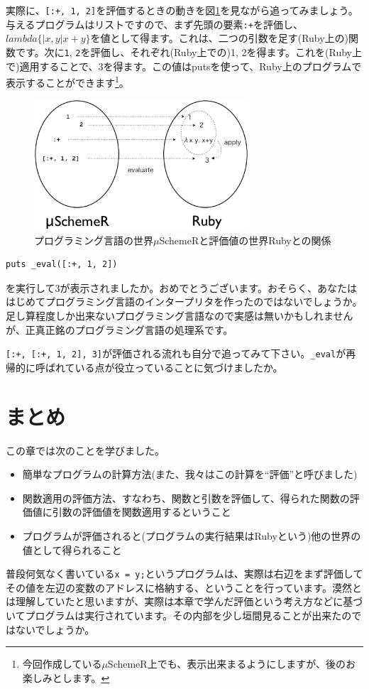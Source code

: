 実際に、{\tt [:+, 1, 2]}を評価するときの動きを図\ref{fig:uschemer_ruby}を見ながら追ってみましょう。与えるプログラムはリストですので、まず先頭の要素{\tt :+}を評価し、$lambda\{|x, y| x + y\}$を値として得ます。これは、二つの引数を足す(Ruby上の)関数です。次に{\tt 1}, {\tt 2}を評価し、それぞれ(Ruby上での)1, 2を得ます。これを(Ruby上で)適用することで、3を得ます。この値はputsを使って、Ruby上のプログラムで表示することができます\footnote{今回作成している$\mu$SchemeR上でも、表示出来まるようにしますが、後のお楽しみとします。}。

\begin{figure}[htbp]
\begin{center}
\includegraphics[width=80mm]{images/uschemer_ruby.eps}
\end{center}
\caption{プログラミング言語の世界$\mu$SchemeRと評価値の世界Rubyとの関係}
\label{fig:uschemer_ruby}
\end{figure}


\begin{lstlisting}
puts _eval([:+, 1, 2])
\end{lstlisting}

を実行して3が表示されましたか。おめでとうございます。おそらく、あなたははじめてプログラミング言語のインタープリタを作ったのではないでしょうか。足し算程度しか出来ないプログラミング言語なので実感は無いかもしれませんが、正真正銘のプログラミング言語の処理系です。

{\tt [:+, [:+, 1, 2], 3]}が評価される流れも自分で追ってみて下さい。{\tt \_eval}が再帰的に呼ばれている点が役立っていることに気づけましたか。

\section{まとめ}

この章では次のことを学びました。

\begin{itemize}
\item 簡単なプログラムの計算方法(また、我々はこの計算を“評価”と呼びました)
\item 関数適用の評価方法、すなわち、関数と引数を評価して、得られた関数の評価値に引数の評価値を関数適用するということ
\item プログラムが評価されると(プログラムの実行結果はRubyという)他の世界の値として得られること
\end{itemize}

普段何気なく書いている{\tt x = y;}というプログラムは、実際は右辺をまず評価してその値を左辺の変数のアドレスに格納する、ということを行っています。漠然とは理解していたと思いますが、実際は本章で学んだ評価という考え方などに基づいてプログラムは実行されています。その内部を少し垣間見ることが出来たのではないでしょうか。
